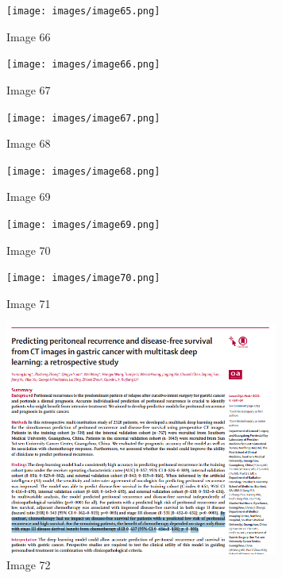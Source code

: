 \documentclass{article}%
\begin{document}
%


\begin{figure}[h!]%
\centering%
\texttt{[image: images/image65.png]}%
\caption{Image 66}%
\end{figure}

%


\begin{figure}[h!]%
\centering%
\texttt{[image: images/image66.png]}%
\caption{Image 67}%
\end{figure}

%


\begin{figure}[h!]%
\centering%
\texttt{[image: images/image67.png]}%
\caption{Image 68}%
\end{figure}

%


\begin{figure}[h!]%
\centering%
\texttt{[image: images/image68.png]}%
\caption{Image 69}%
\end{figure}

%


\begin{figure}[h!]%
\centering%
\texttt{[image: images/image69.png]}%
\caption{Image 70}%
\end{figure}

%


\begin{figure}[h!]%
\centering%
\texttt{[image: images/image70.png]}%
\caption{Image 71}%
\end{figure}

%


\begin{figure}[h!]%
\centering%
\includegraphics[width=0.8\textwidth]{images/image71.png}%
\caption{Image 72}%
\end{figure}
\end{document}

